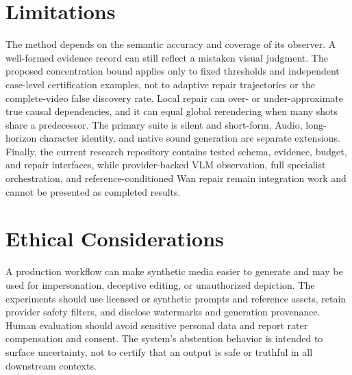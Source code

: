 \documentclass[11pt]{article}
\begin{document}
\section*{Limitations}
\label{sec:limitations}

The method depends on the semantic accuracy and coverage of its observer. A
well-formed evidence record can still reflect a mistaken visual judgment. The
proposed concentration bound applies only to fixed thresholds and independent
case-level certification examples, not to adaptive repair trajectories or the
complete-video false discovery rate. Local repair can over- or under-approximate
true causal dependencies, and it can equal global rerendering when many shots
share a predecessor. The primary suite is silent and short-form. Audio,
long-horizon character identity, and native sound generation are separate
extensions. Finally, the current research repository contains tested schema,
evidence, budget, and repair interfaces, while provider-backed VLM observation,
full specialist orchestration, and reference-conditioned Wan repair remain
integration work and cannot be presented as completed results.

\section*{Ethical Considerations}
\label{sec:ethics}

A production workflow can make synthetic media easier to generate and may be
used for impersonation, deceptive editing, or unauthorized depiction. The
experiments should use licensed or synthetic prompts and reference assets,
retain provider safety filters, and disclose watermarks and generation
provenance. Human evaluation should avoid sensitive personal data and report
rater compensation and consent. The system's abstention behavior is intended
to surface uncertainty, not to certify that an output is safe or truthful in
all downstream contexts.


\appendix


\end{document}
